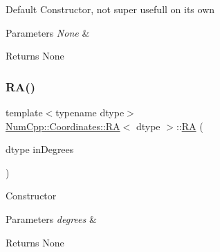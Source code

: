 Default Constructor, not super usefull on its own


\begin{DoxyParams}{Parameters}
{\em None} & \\
\hline
\end{DoxyParams}
\begin{DoxyReturn}{Returns}
None 
\end{DoxyReturn}
\mbox{\label{class_num_cpp_1_1_coordinates_1_1_r_a_aad5922149d4f739d1ab3871fa4147554}} 
\subsubsection{\texorpdfstring{R\+A()}{RA()}\hspace{0.1cm}{\footnotesize\ttfamily [2/3]}}
{\footnotesize\ttfamily template$<$typename dtype$>$ \\
\mbox{\hyperlink{class_num_cpp_1_1_coordinates_1_1_r_a}{Num\+Cpp\+::\+Coordinates\+::\+RA}}$<$ dtype $>$\+::\mbox{\hyperlink{class_num_cpp_1_1_coordinates_1_1_r_a}{RA}} (\begin{DoxyParamCaption}\item[{dtype}]{in\+Degrees }\end{DoxyParamCaption})\hspace{0.3cm}{\ttfamily [inline]}}

Constructor


\begin{DoxyParams}{Parameters}
{\em degrees} & \\
\hline
\end{DoxyParams}
\begin{DoxyReturn}{Returns}
None 
\end{DoxyReturn}
\mbox{\label{class_num_cpp_1_1_coordinates_1_1_r_a_aa735fd57670cd15d05098de22dc51929}} 
